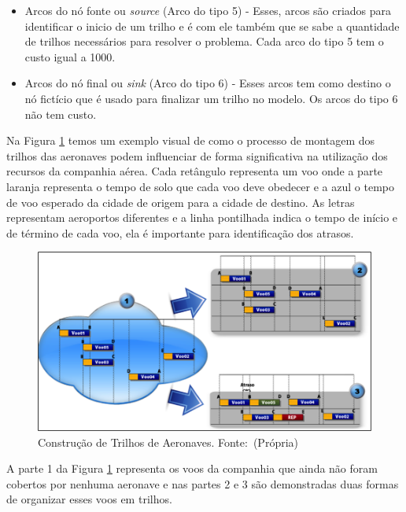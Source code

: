 \begin{itemize}
\begin{figure}[ht]
\end{figure}

\item Arcos do nó fonte ou \textit{source} (Arco do tipo 5) - Esses, arcos são
criados para identificar o inicio de um trilho e é com ele também que se sabe a
quantidade de trilhos necessários para resolver o problema. Cada arco do tipo 5
tem o custo igual a 1000.

\item Arcos do nó final ou \textit{sink} (Arco do tipo 6) - Esses arcos tem
como destino o nó fictício que é usado para finalizar um trilho no modelo. Os
arcos do tipo 6 não tem custo.

\end{itemize}

Na Figura \ref{fig:arpexample} temos um exemplo visual de como o processo de 
montagem dos trilhos das aeronaves podem influenciar de forma significativa na
utilização dos recursos da companhia aérea. Cada retângulo representa um voo
onde a parte laranja representa o tempo de solo que cada voo deve obedecer e a
azul o tempo de voo esperado da cidade de origem para a cidade de destino. As
letras representam aeroportos diferentes e a linha pontilhada indica o tempo de
início e de término de cada voo, ela é importante para identificação dos
atrasos.

\begin{figure}[ht]
	\caption{Construção de Trilhos de Aeronaves. \newline \mbox{Fonte: (Própria)}}
	\label{fig:arpexample}
	\includegraphics[scale=0.6]{./img/arpexample}
\end{figure}

A parte 1 da Figura \ref{fig:arpexample} representa os voos da companhia que
ainda não foram cobertos por nenhuma aeronave e nas partes 2 e 3 são
demonstradas duas formas de organizar esses voos em trilhos.

